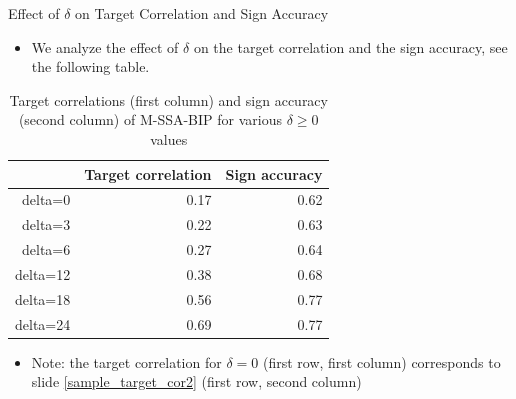 \documentclass{beamer}
\begin{document}





\begin{frame} {Effect of $\delta$ on Target Correlation and Sign Accuracy}\label{sample_target_cor3}
\begin{itemize}
\item We analyze the effect of $\delta$ on the target correlation and the sign accuracy, see the following table. 
\end{itemize}

\begin{table}[ht]
\centering
\begin{tabular}{rrr}
  \hline
 & Target correlation & Sign accuracy \\ 
  \hline
delta=0 & 0.17 & 0.62 \\ 
  delta=3 & 0.22 & 0.63 \\ 
  delta=6 & 0.27 & 0.64 \\ 
  delta=12 & 0.38 & 0.68 \\ 
  delta=18 & 0.56 & 0.77 \\ 
  delta=24 & 0.69 & 0.77 \\ 
   \hline
\end{tabular}
\caption{Target correlations (first column) and sign accuracy (second column) of M-SSA-BIP for various $\delta\geq 0$ values } 
\label{perf_var1}
\end{table}\begin{itemize}
\item Note: the target correlation for $\delta=0$ (first row, first column) corresponds to slide \eqref{sample_target_cor2} (first row, second column)
\end{itemize}


\end{frame}
\end{document}

